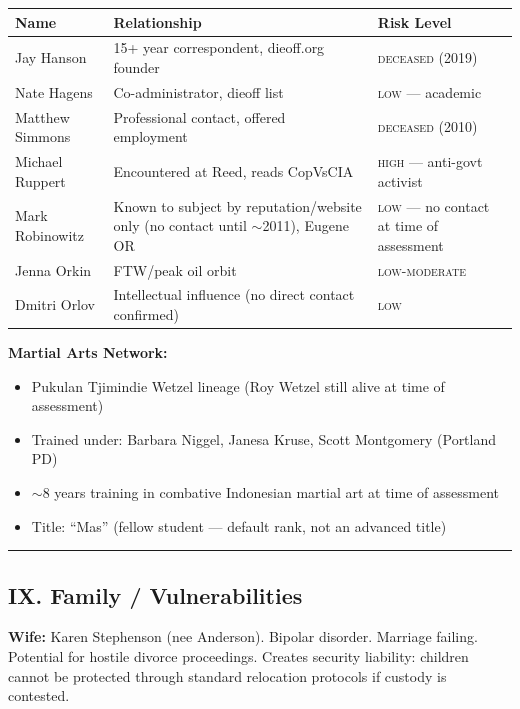 {%
\small
\begin{tabular}{p{3.2cm} p{6.5cm} p{3.8cm}}
\hline
\textbf{Name} & \textbf{Relationship} & \textbf{Risk Level} \\
\hline
Jay Hanson & 15+ year correspondent, dieoff.org founder & \textsc{deceased} (2019) \\
Nate Hagens & Co-administrator, dieoff list & \textsc{low} --- academic \\
Matthew Simmons & Professional contact, offered employment & \textsc{deceased} (2010) \\
Michael Ruppert & Encountered at Reed, reads CopVsCIA & \textsc{high} --- anti-govt activist \\
Mark Robinowitz & Known to subject by reputation/website only (no contact until $\sim$2011), Eugene OR & \textsc{low} --- no contact at time of assessment \\
Jenna Orkin & FTW/peak oil orbit & \textsc{low-moderate} \\
Dmitri Orlov & Intellectual influence (no direct contact confirmed) & \textsc{low} \\
\hline
\end{tabular}
}%

\medskip

\textbf{Martial Arts Network:}

\begin{itemize}[nosep]
\item Pukulan Tjimindie Wetzel lineage (Roy Wetzel still alive at time of assessment)
\item Trained under: Barbara Niggel, Janesa Kruse, Scott Montgomery (Portland PD)
\item $\sim$8 years training in combative Indonesian martial art at time of assessment
\item Title: ``Mas'' (fellow student --- default rank, not an advanced title)
\end{itemize}

\vspace{1cm}\hrule\vspace{1cm}

\subsection*{IX. Family / Vulnerabilities}
\label{interlude:family-vulnerabilities}

\textbf{Wife:} Karen Stephenson (nee Anderson). Bipolar disorder. Marriage failing. Potential for hostile divorce proceedings. Creates security liability: children cannot be protected through standard relocation protocols if custody is contested.

